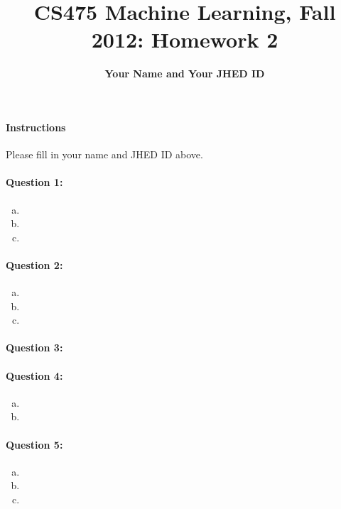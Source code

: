 \documentclass[letterpaper,11pt]{article}
\title{CS475 Machine Learning, Fall 2012: Homework 2}
\date{}
\author{\bf Your Name and Your JHED ID}
\begin{document}
\maketitle

\paragraph*{Instructions} Please fill in your name and JHED ID above.

\paragraph{Question 1:}
\begin{enumerate}[(a)]
\item
\item
\item
\end{enumerate}

\paragraph{Question 2:}
\begin{enumerate}[(a)]
\item
\item
\item
\end{enumerate}

\paragraph{Question 3:}

\paragraph{Question 4:}
\begin{enumerate}[(a)]
\item
\item
\end{enumerate}

\paragraph{Question 5:}
\begin{enumerate}[(a)]
\item
\item
\item
\end{enumerate}
\end{document}
